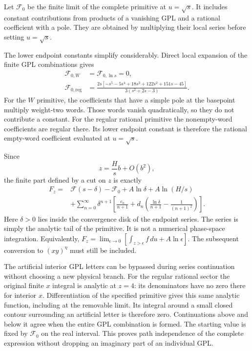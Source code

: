 Let $\mathcal F_0$ be the finite limit of the complete primitive at
$u=\sqrt{s}$. It includes constant contributions from products of a
vanishing GPL and a rational coefficient with a pole. They are
obtained by multiplying their local series before setting
$u=\sqrt{s}$.

The lower endpoint constants simplify considerably. Direct local
expansion of the finite GPL combinations gives
\begin{align}
 \mathcal F_{0,W}&=\mathcal F_{0,\ln s}=0,\\
 \mathcal F_{0,\mathrm{reg}}
 &=\frac{2s[-s^5-5s^4+18s^3+122s^2+151s-45]}
              {3(s^2+2s-3)}.
\end{align}
For the $W$ primitive, the coefficients that have a simple pole at
the basepoint multiply weight-two words. Those words vanish
quadratically, so they do not contribute a constant. For the
regular rational primitive the nonempty-word coefficients are
regular there. Its lower endpoint constant is therefore the
rational empty-word coefficient evaluated at $u=\sqrt{s}$.

Since
\begin{equation}
 z=\frac{H}{s}b+O(b^2),
\end{equation}
the finite part defined by a cut on $z$ is exactly
\begin{align}
 F_z={}&\mathcal F(s-\delta)-\mathcal F_0
       +A\ln\delta+A\ln(H/s)\\
 &+\sum_{n=0}^{\infty}\delta^{n+1}
  \left[\frac{c_n}{n+1}
       +d_n\left(\frac{\ln\delta}{n+1}
                         -\frac{1}{(n+1)^2}\right)\right].
 \label{eq:comp-real-gpl-endpoint-finite}
\end{align}
Here $\delta>0$ lies inside the convergence disk of the endpoint
series. The series is simply the analytic tail of the primitive.
It is not a numerical phase-space integration. Equivalently,
$F_z=\lim_{\epsilon\to0}[\int_{z>\epsilon}f\,du+A\ln\epsilon]$.
The subsequent conversion to $(xy)^\eta$ must still be included.

The artificial interior GPL letters can be bypassed during series
continuation without choosing a new physical branch. For the
regular rational sector the original finite $x$ integral is analytic
at $z=4$: its denominators have no zero there for interior $x$.
Differentiation of the specified primitive gives this same analytic
function, including at the removable limit. Its integral around a
small closed contour surrounding an artificial letter is therefore
zero. Continuations above and below it agree when the entire GPL
combination is formed. The starting value is fixed by
$\mathcal F_0$ on the real interval. This proves path independence
of the complete expression without dropping an imaginary part of
an individual GPL.

